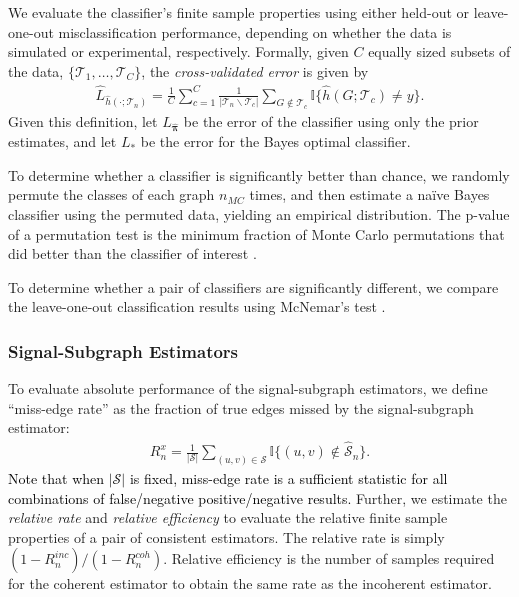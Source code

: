 \documentclass[10pt,journal,cspaper,compsoc]{IEEEtran}
\providecommand{\tk}[1]{\textcolor{black}{#1}}
\newcommand{\II}{\mathbb{I}}           %
\providecommand{\mc}[1]{\mathcal{#1}}
\providecommand{\wh}[1]{\widehat{#1}}
\providecommand{\mhc}[1]{\widehat{\mathcal{#1}}}
\providecommand{\mhb}[1]{\hat{\boldsymbol{#1}}}
\begin{document}
We evaluate the classifier's finite sample properties using either held-out or leave-one-out misclassification performance, depending on whether the data is simulated or experimental, respectively.  Formally, given $C$ equally sized subsets of the data, $\{\mc{T}_{1}, \ldots, \mc{T}_{C}\}$, the \emph{cross-validated error} is given by
\begin{align} \label{eq:L2}
	\wh{L}_{\wh{h}(\cdot; \mc{T}_n)} = \frac{1}{C}\sum_{c=1}^C \frac{1}{|\mc{T}_n \backslash \mc{T}_c|}\sum_{G \notin \mc{T}_c} \II\{\wh{h}(G; \mc{T}_{c}) \neq y\}.
\end{align}
Given this definition, let $L_{\mhb{\pi}}$ be the error of the classifier using only the prior estimates, and let $L_*$ be the error for the Bayes optimal classifier.  

To determine whether a classifier is significantly better than chance, we randomly permute the classes of each graph $n_{MC}$ times, and then estimate a na\"ive Bayes classifier using the permuted data, yielding an empirical distribution.  The p-value of a permutation test is the minimum fraction of Monte Carlo permutations that did better than the classifier of interest \cite{Good2010}.  

To determine whether a pair of classifiers are significantly different, we compare the leave-one-out classification results using McNemar's test \cite{McNemar1947}.


\subsubsection{Signal-Subgraph Estimators} %
\label{ssub:signal_subgraph_estimators}


To evaluate absolute performance of the signal-subgraph estimators, we define  ``miss-edge rate'' as the fraction of true edges missed by the signal-subgraph estimator:
\begin{align}
R^x_n = \frac{1}{|\mc{S}|} \sum_{(u,v)\in \mc{S}}\II\{(u,v) \notin \mhc{S}_n\}.
\end{align}
\tk{Note that when $|\mc{S}|$ is fixed, miss-edge rate is a sufficient statistic for all combinations of false/negative positive/negative results.}
Further, we estimate the \emph{relative rate} and \emph{relative efficiency} to evaluate the relative finite sample properties of a pair of consistent estimators. The relative rate is simply $(1-R^{inc}_n)/(1-R^{coh}_n)$.  Relative efficiency is the number of samples required for the coherent estimator to obtain the same rate as the incoherent estimator.
\end{document}
